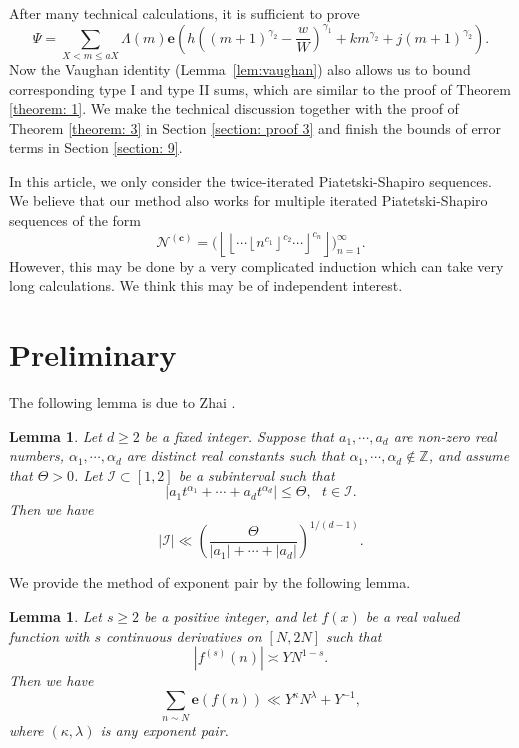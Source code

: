 \documentclass[12pt, reqno, twoside, letterpaper]{amsart}
\numberwithin{equation}{section}
\def\fl#1{\left\lfloor#1\right\rfloor}
\theoremstyle{customthm}
\newtheorem{lemma}[X]{Lemma}
\theoremstyle{customrem}
\begin{document}
After many technical calculations, it is sufficient to prove
$$
\Psi =\sum_{X < m \leqslant aX}
\Lambda(m)\mathbf{e}\left(h\left((m+1)^{\gamma_2}-\frac{w}{W}\right)^{\gamma_1}
+km^{\gamma_2}+j(m+1)^{\gamma_2}\right).
$$
Now the Vaughan identity (Lemma~\ref{lem:vaughan}) also allows us to bound corresponding type I and type II sums, which are similar to the proof of Theorem \ref{theorem: 1}. We make the technical discussion together with the proof of Theorem \ref{theorem: 3} in Section \ref{section: proof 3} and finish the bounds of error terms in Section \ref{section: 9}.

In this article, we only consider the twice-iterated Piatetski-Shapiro sequences. We believe that our method also works for multiple iterated Piatetski-Shapiro sequences of the form
$$
\mathcal{N}^{(\mathbf{c})} = \big(\fl{\fl{\cdots{\fl{n^{c_1}}^{c_2}}\cdots}^{c_n}}\big)_{n=1}^\infty.
$$
However, this may be done by a very complicated induction which can take very long calculations. We think this may be of independent interest.

\section{Preliminary}\label{section: Preliminary}

The following lemma is due to Zhai \cite[Proposition 1]{Zhai1999}.
\begin{lemma}\label{lemma: zhai's lemma}
Let $d\geqslant 2$ be a fixed integer. Suppose that $a_1,\cdots,a_d$ are non-zero real numbers,
$\alpha_1,\cdots,\alpha_d$ are distinct real constants such that $\alpha_1,\cdots,\alpha_d\not\in\mathbb{Z}$,
and assume that $\Theta>0$. Let $\mathcal{I}\subset[1,2]$ be a subinterval such that
$$
\left|a_1 t^{\alpha_1} + \cdots+a_d t^{\alpha_d} \right|\leqslant \Theta,\ \ \ t\in\mathcal{I}.
$$
Then we have
$$
|\mathcal{I}|\ll \left(\frac{\Theta}{|a_1|+\cdots+|a_d|}\right)^{1/(d-1)}.
$$
\end{lemma}

We provide the method of exponent pair by the following lemma.

\begin{lemma}\label{lem: exponent pair method}
Let $s\geqslant 2$ be a positive integer, and let $f(x)$ be a real valued
function with $s$ continuous derivatives on $[N,2N]$ such that
$$
|f^{(s)}(n)|\asymp YN^{1-s}.
$$
Then we have
$$
\sum_{n\sim N}\mathbf{e}(f(n))\ll Y^{\kappa}N^{\lambda}+Y^{-1},
$$
where $(\kappa,\lambda)$ is any exponent pair.
\end{lemma}
\end{document}
